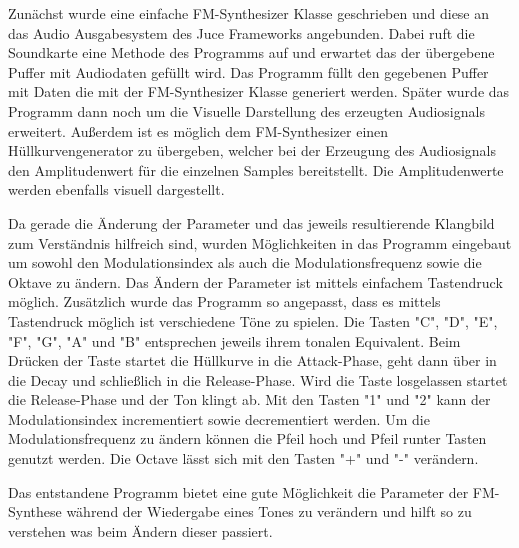 Zunächst wurde eine einfache FM-Synthesizer Klasse geschrieben und diese an das Audio Ausgabesystem des Juce Frameworks angebunden. Dabei ruft die Soundkarte eine Methode des Programms auf und erwartet das der übergebene Puffer mit Audiodaten gefüllt wird. Das Programm füllt den gegebenen Puffer mit Daten die mit der FM-Synthesizer Klasse generiert werden. Später wurde das Programm dann noch um die Visuelle Darstellung des erzeugten Audiosignals erweitert. Außerdem ist es möglich dem FM-Synthesizer einen Hüllkurvengenerator zu übergeben, welcher bei der Erzeugung des Audiosignals den Amplitudenwert für die einzelnen Samples bereitstellt. Die Amplitudenwerte werden ebenfalls visuell dargestellt.

Da gerade die Änderung der Parameter und das jeweils resultierende Klangbild zum Verständnis hilfreich sind, wurden Möglichkeiten in das Programm eingebaut um sowohl den Modulationsindex als auch die Modulationsfrequenz sowie die Oktave zu ändern. Das Ändern der Parameter ist mittels einfachem Tastendruck möglich. Zusätzlich wurde das Programm so angepasst, dass es mittels Tastendruck möglich ist verschiedene Töne zu spielen. Die Tasten "C", "D", "E", "F", "G", "A" und "B" entsprechen jeweils ihrem tonalen Equivalent. Beim Drücken der Taste startet die Hüllkurve in die Attack-Phase, geht dann über in die Decay und schließlich in die Release-Phase. Wird die Taste losgelassen startet die Release-Phase und der Ton klingt ab. Mit den Tasten "1" und "2" kann der Modulationsindex incrementiert sowie decrementiert werden. Um die Modulationsfrequenz zu ändern können die Pfeil hoch und Pfeil runter Tasten genutzt werden. Die Octave lässt sich mit den Tasten "+" und "-" verändern.

Das entstandene Programm bietet eine gute Möglichkeit die Parameter der FM-Synthese während der Wiedergabe eines Tones zu verändern und hilft so zu verstehen was beim Ändern dieser passiert.
\FloatBarrier